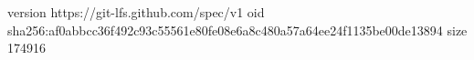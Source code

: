 version https://git-lfs.github.com/spec/v1
oid sha256:af0abbcc36f492c93c55561e80fe08e6a8c480a57a64ee24f1135be00de13894
size 174916

